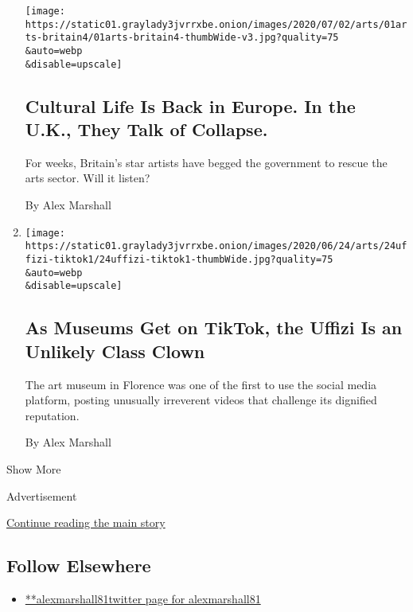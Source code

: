 \begin{enumerate}
  \texttt{[image: https://static01.graylady3jvrrxbe.onion/images/2020/07/02/arts/01arts-britain4/01arts-britain4-thumbWide-v3.jpg?quality=75\\\&auto=webp\\\&disable=upscale]}

  \hypertarget{cultural-life-is-back-in-europe-in-the-uk-they-talk-of-collapse}{%
  \subsection{Cultural Life Is Back in Europe. In the U.K., They Talk of
  Collapse.}\label{cultural-life-is-back-in-europe-in-the-uk-they-talk-of-collapse}}

  For weeks, Britain's star artists have begged the government to rescue
  the arts sector. Will it listen?

  By Alex Marshall
\item
  \href{/2020/06/24/arts/design/uffizi-museums-tiktok.html}{}

  \texttt{[image: https://static01.graylady3jvrrxbe.onion/images/2020/06/24/arts/24uffizi-tiktok1/24uffizi-tiktok1-thumbWide.jpg?quality=75\\\&auto=webp\\\&disable=upscale]}

  \hypertarget{as-museums-get-on-tiktok-the-uffizi-is-an-unlikely-class-clown}{%
  \subsection{As Museums Get on TikTok, the Uffizi Is an Unlikely Class
  Clown}\label{as-museums-get-on-tiktok-the-uffizi-is-an-unlikely-class-clown}}

  The art museum in Florence was one of the first to use the social
  media platform, posting unusually irreverent videos that challenge its
  dignified reputation.

  By Alex Marshall
\end{enumerate}

Show More

Advertisement

\protect\hyperlink{after-mid2}{Continue reading the main story}

\hypertarget{follow-elsewhere}{%
\subsection{Follow Elsewhere}\label{follow-elsewhere}}

\begin{itemize}
\tightlist
\item
  \href{https://twitter.com/alexmarshall81}{**alexmarshall81twitter page
  for alexmarshall81}
\end{itemize}

